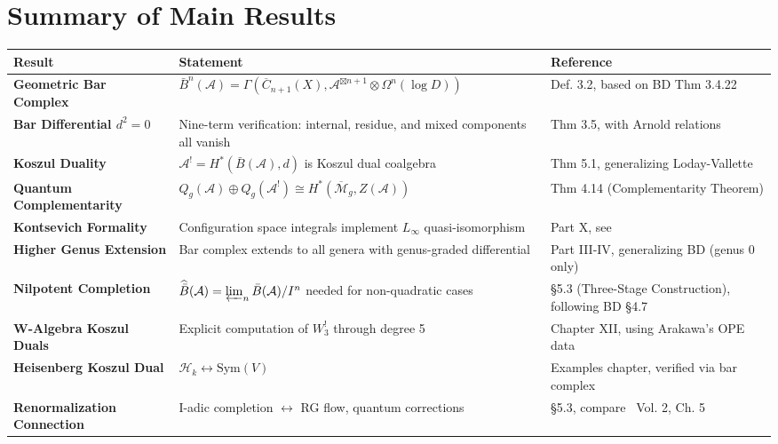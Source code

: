 \documentclass[11pt]{memoir}
\newcommand{\KonFormality}{\cite{Kontsevich99}}  %
\newcommand{\CG}{\cite{CostelloGwilliam}}        %
\newcommand{\LV}{\cite{LodayVallette}}           %
\begin{document}
\tableofcontents

\medskip


\section*{Summary of Main Results}
\begin{center}
\begin{tabular}{|p{3.5cm}|p{5cm}|p{5cm}|}
\hline
\textbf{Result} & \textbf{Statement} & \textbf{Reference} \\
\hline
\hline
\textbf{Geometric Bar Complex} & 
$\bar{B}^n(\mathcal{A}) = \Gamma(\overline{C}_{n+1}(X), \mathcal{A}^{\boxtimes n+1} \otimes \Omega^n(\log D))$ & 
Def. 3.2, based on BD Thm 3.4.22 \\
\hline
\textbf{Bar Differential $d^2=0$} & 
Nine-term verification: internal, residue, and mixed components all vanish & 
Thm 3.5, with Arnold relations \\
\hline
\textbf{Koszul Duality} & 
$\mathcal{A}^! = H^*(\bar{B}(\mathcal{A}), d)$ is Koszul dual coalgebra & 
Thm 5.1, generalizing Loday-Vallette \LV \\
\hline
\textbf{Quantum Complementarity} & 
$Q_g(\mathcal{A}) \oplus Q_g(\mathcal{A}^!) \cong H^*(\overline{\mathcal{M}}_g, Z(\mathcal{A}))$ & 
Thm 4.14 (Complementarity Theorem) \\
\hline
\textbf{Kontsevich Formality} & 
Configuration space integrals implement $L_\infty$ quasi-isomorphism & 
Part X, see \KonFormality \\
\hline
\textbf{Higher Genus Extension} & 
Bar complex extends to all genera with genus-graded differential & 
Part III-IV, generalizing BD (genus 0 only) \\
\hline
\textbf{Nilpotent Completion} & 
$\widehat{\bar{B}}(\mathcal{A}) = \varprojlim_n \bar{B}(\mathcal{A})/I^n$ needed for non-quadratic cases & 
\S5.3 (Three-Stage Construction), following BD \S4.7 \\
\hline
\textbf{W-Algebra Koszul Duals} & 
Explicit computation of $W_3^!$ through degree 5 & 
Chapter XII, using Arakawa's OPE data \\
\hline
\textbf{Heisenberg Koszul Dual} & 
$\mathcal{H}_k \leftrightarrow \text{Sym}(V)$ & 
Examples chapter, verified via bar complex \\
\hline
\textbf{Renormalization Connection} & 
I-adic completion $\leftrightarrow$ RG flow, quantum corrections & 
\S5.3, compare \CG~Vol. 2, Ch. 5 \\
\hline
\end{tabular}
\end{center}
\end{document}
